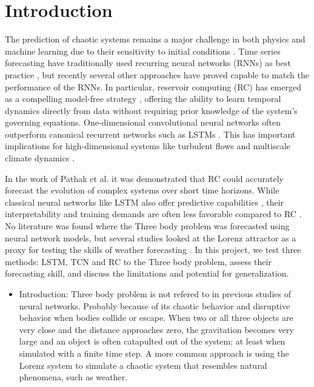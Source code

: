 \documentclass[%
 reprint,
 amsmath,amssymb,
 aps,
]{revtex4-2}
\begin{document}
\section{\label{sec:intro}Introduction} %

The prediction of chaotic systems remains a major challenge in both physics and machine learning due to their sensitivity to initial conditions \cite{grebogi1983final}. Time series forecasting have traditionally used recurring neural networks (RNNs) as best practice \cite{vlachas2018data}, but recently several other approaches have proved capable to match the performance of the RNNs. In particular, reservoir computing (RC) has emerged as a compelling model-free strategy \cite{pathak2018model}, offering the ability to learn temporal dynamics directly from data without requiring prior knowledge of the system's governing equations. One-dimensional convolutional neural networks often outperform canonical recurrent networks such as LSTMs \cite{bai2018empiricalevaluationgenericconvolutional}. 
This has important implications for high-dimensional systems like turbulent flows \cite{Pandey_PhysRevFluids.5.113506} and multiscale climate dynamics \cite{Chattopadhyay2019}.

In the work of Pathak et al. \cite{pathak2018model} it was demonstrated that RC could accurately forecast the evolution of complex systems over short time horizons. While classical neural networks like LSTM also offer predictive capabilities \cite{vlachas2018data}, their interpretability and training demands are often less 
favorable compared to RC \cite{Kobayashi_PhysRevE.104.044215}. No literature was found where the Three body problem was forecasted using neural network models, but several studies looked at the Lorenz attractor as a proxy for testing the skills of weather forecasting \cite{Chattopadhyay2019, vlachas2018data}.
In this project, we test three methods: LSTM, TCN and RC to the Three body problem, assess their forecasting skill, and discuss the limitations and potential for generalization.

\begin{itemize}
    \item Introduction: Three body problem is not refered to in previous studies of neural networks. Probably because of its chaotic behavior and disruptive behavior when bodies collide or escape. When two or all three objects are very close and the distance approaches zero, the gravitation becomes very large and an object is often catapulted out of the system; at least when simulated with a finite time step. A more common approach is using the Lorenz system to simulate a chaotic system that resembles natural phenomena, such as weather.
\end{itemize}
\end{document}

